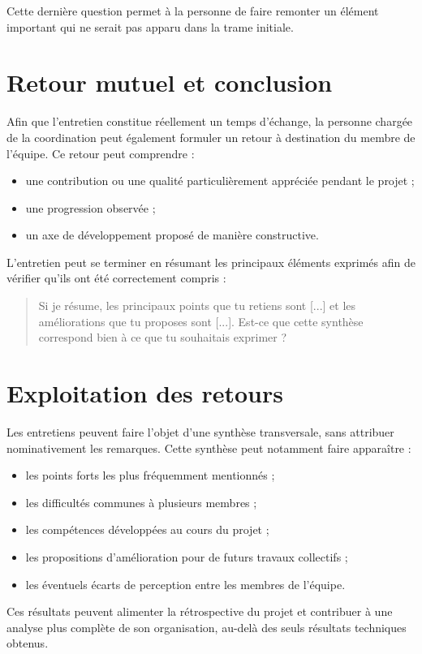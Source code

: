 Cette dernière question permet à la personne de faire remonter un élément important qui ne serait pas apparu dans la trame initiale.

\section{Retour mutuel et conclusion}

Afin que l'entretien constitue réellement un temps d'échange, la personne chargée de la coordination peut également formuler un retour à destination du membre de l'équipe. Ce retour peut comprendre :

\begin{itemize}
    \item une contribution ou une qualité particulièrement appréciée pendant le projet ;
    \item une progression observée ;
    \item un axe de développement proposé de manière constructive.
\end{itemize}

L'entretien peut se terminer en résumant les principaux éléments exprimés afin de vérifier qu'ils ont été correctement compris :

\begin{quote}
Si je résume, les principaux points que tu retiens sont [...] et les améliorations que tu proposes sont [...]. Est-ce que cette synthèse correspond bien à ce que tu souhaitais exprimer ?
\end{quote}

\section{Exploitation des retours}

Les entretiens peuvent faire l'objet d'une synthèse transversale, sans attribuer nominativement les remarques. Cette synthèse peut notamment faire apparaître :

\begin{itemize}
    \item les points forts les plus fréquemment mentionnés ;
    \item les difficultés communes à plusieurs membres ;
    \item les compétences développées au cours du projet ;
    \item les propositions d'amélioration pour de futurs travaux collectifs ;
    \item les éventuels écarts de perception entre les membres de l'équipe.
\end{itemize}

Ces résultats peuvent alimenter la rétrospective du projet et contribuer à une analyse plus complète de son organisation, au-delà des seuls résultats techniques obtenus.
